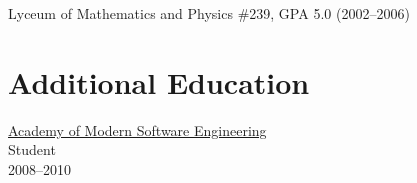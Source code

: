 \blankline

Lyceum of Mathematics and Physics \#239, GPA 5.0 (2002--2006)

\section{Additional Education}
\href{http://www.amse.ru/}{Academy of Modern Software Engineering}\\
      Student\\
      2008--2010

\blankline




